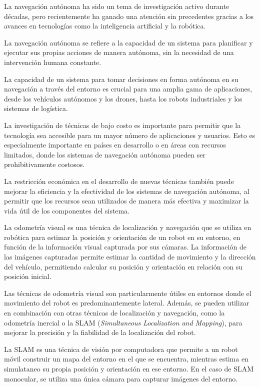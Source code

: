 \documentclass[
11pt, %
codirector, %
]{charter}
\begin{document}
La navegación autónoma ha sido un tema de investigación activo durante décadas, pero recientemente ha ganado una atención sin precedentes gracias a los avances en tecnologías como la inteligencia artificial y la robótica.

La navegación autónoma se refiere a la capacidad de un sistema para planificar y ejecutar sus propias acciones de manera autónoma, sin la necesidad de una intervención humana constante.

La capacidad de un sistema para tomar decisiones en forma autónoma en su navegación a través del entorno es crucial para una amplia gama de aplicaciones, desde los vehículos autónomos y los drones, hasta los robots industriales y los sistemas de logística.

La investigación de técnicas de bajo costo es importante para permitir que la tecnología sea accesible para un mayor número de aplicaciones y usuarios. Esto es especialmente importante en países en desarrollo o en áreas con recursos limitados, donde los sistemas de navegación autónoma pueden ser prohibitivamente costosos. 

La restricción económica en el desarrollo de nuevas técnicas también puede mejorar la eficiencia y la efectividad de los sistemas de navegación autónoma, al permitir que los recursos sean utilizados de manera más efectiva y maximizar la vida útil de los componentes del sistema.

La odometría visual es una técnica de localización y navegación que se utiliza en robótica para estimar la posición y orientación de un robot en su entorno, en función de la información visual capturada por sus cámaras. La información de las imágenes capturadas permite estimar la cantidad de movimiento y la dirección del vehículo, permitiendo calcular su posición y orientación en relación con su posición inicial.

Las técnicas de odometría visual son particularmente útiles en entornos donde el movimiento del robot es predominantemente lateral. Además, se pueden utilizar en combinación con otras técnicas de localización y navegación, como la odometría inercial o la SLAM (\textit{Simultaneous Localization and Mapping}), para mejorar la precisión y la fiabilidad de la localización del robot.

La SLAM es una técnica de visión por computadora que permite a un robot móvil construir un mapa del entorno en el que se encuentra, mientras estima en simulataneo su propia posición y orientación en ese entorno. En el caso de SLAM monocular, se utiliza una única cámara para capturar imágenes del entorno.
\end{document}
